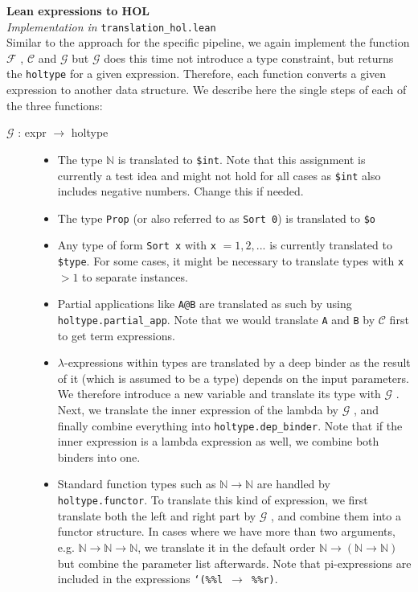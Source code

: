 \documentclass[a4paper]{article}
\newcommand{\F}[0]{$\mathcal{F}$ }
\newcommand{\G}[0]{$\mathcal{G}$ }
\newcommand{\C}[0]{$\mathcal{C}$ }
\begin{document}
\textbf{Lean expressions to HOL}\\
\textit{Implementation in }\texttt{translation\_hol.lean}\\
Similar to the approach for the specific pipeline, we again implement the function \F, \C and \G but \G does this time not introduce a type constraint, but returns the \texttt{holtype} for a given expression. Therefore, each function converts a given expression to another data structure. We describe here the single steps of each of the three functions:
\begin{description}
	\item[\G: expr $\to$ holtype] \text{ }
	\begin{itemize}
		\item The type $\mathbb{N}$ is translated to \texttt{\$int}. Note that this assignment is currently a test idea and might not hold for all cases as \texttt{\$int} also includes negative numbers. Change this if needed.
		\item The type \texttt{Prop} (or also referred to as \texttt{Sort 0}) is translated to \texttt{\$o}
		\item Any type of form \texttt{Sort x} with \texttt{x} $=1,2,...$ is currently translated to \texttt{\$type}. For some cases, it might be necessary to translate types with \texttt{x} $>1$ to separate instances.
		\item Partial applications like \texttt{A@B} are translated as such by using \texttt{holtype.partial\_app}. Note that we would translate \texttt{A} and \texttt{B} by \C first to get term expressions.
		\item $\lambda$-expressions within types are translated by a deep binder as the result of it (which is assumed to be a type) depends on the input parameters. We therefore introduce a new variable and translate its type with \G. Next, we translate the inner expression of the lambda by \G, and finally combine everything into \texttt{holtype.dep\_binder}. Note that if the inner expression is a lambda expression as well, we combine both binders into one.
		\item Standard function types such as $\mathbb{N}\to\mathbb{N}$ are handled by \texttt{holtype.functor}. To translate this kind of expression, we first translate both the left and right part by \G, and combine them into a functor structure. In cases where we have more than two arguments, e.g. $\mathbb{N}\to\mathbb{N}\to\mathbb{N}$, we translate it in the default order $\mathbb{N}\to\left(\mathbb{N}\to\mathbb{N}\right)$ but combine the parameter list afterwards. Note that pi-expressions are included in the expressions \texttt{`(\%\%l $\to$ \%\%r)}.

\end{itemize}
\end{description}
\end{document}
